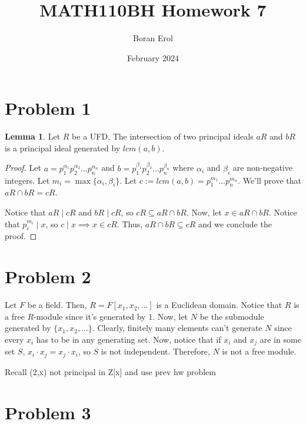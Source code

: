 \documentclass{article}
\title{MATH110BH Homework 7}
\date{February 2024}
\author{Boran Erol}
\theoremstyle{definition}
\newtheorem{lemma}[theorem]{Lemma}
\begin{document}
\maketitle

\section{Problem 1}



\begin{lemma}
    Let $R$ be a UFD, The intersection of two principal ideals $aR$ and $bR$ is a principal ideal generated by $lcm(a,b)$.
\end{lemma}
\begin{proof}
    Let $a = p_{1}^{\alpha_{1}}p_{2}^{\alpha_{2}}...p_{n}^{\alpha_{n}}$ and $b = p_{1}^{\beta_{1}}p_{2}^{\beta_{2}}...p_{n}^{\beta_{n}}$ where $\alpha_{i}$ and $\beta_{i}$ are non-negative integers. Let $m_{i} = \max \{ \alpha_{i}, \beta_{i} \}$.
    Let $c := lcm(a,b) = p_{1}^{m_{1}}...p_{n}^{m_{n}}$. We'll prove that $aR \cap bR = cR$.

    Notice that $aR \mid cR$ and $bR \mid cR$, so $cR \subseteq aR \cap bR$. Now, let $x \in aR \cap bR$. Notice that $p_{i}^{m_{i}} \mid x$, so $c \mid x \implies x \in cR$. Thus, $aR \cap bR \subseteq cR$ and we conclude the proof.
\end{proof}

\section{Problem 2}

Let $F$ be a field. Then, $R = F[x_{1},x_{2},...]$ is a Euclidean domain. Notice that $R$ is a free $R$-module since it's generated by $1$. Now, let $N$ be the submodule generated by $\{x_{1},x_{2},...\}$. Clearly, finitely many elements can't generate $N$ since every $x_{i}$ has to be in any generating set. Now, notice that if $x_{i}$ and $x_{j}$ are in some set $S$, $x_{i} \cdot x_{j} = x_{j} \cdot x_{i}$, so $S$ is not independent. Therefore, $N$ is not a free module.

Recall (2,x) not principal in Z[x] and use prev hw problem

\section{Problem 3}
\end{document}

